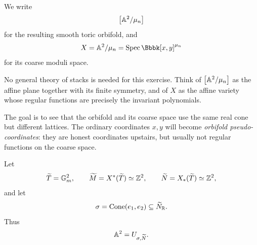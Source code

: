 We write
\[
\left[\mathbb{A}^2/\mu_n\right]
\]
for the resulting smooth toric orbifold, and
\[
X
=
\AAA^2/\mu_n
=
\Spec\Bbbk[x,y]^{\mu_n}
\]
for its coarse moduli space.

No general theory of stacks is needed for this exercise. Think of
\(\left[\mathbb{A}^2/\mu_n\right]\) as the affine plane together with its
finite symmetry, and of \(X\) as the affine variety whose regular
functions are precisely the invariant polynomials.

The goal is to see that the orbifold and its coarse space use the
same real cone but different lattices. The ordinary coordinates
\(x,y\) will become \emph{orbifold pseudo-coordinates}: they are
honest coordinates upstairs, but usually not regular functions on the
coarse space.

Let
\[
\widetilde T=\mathbb{G}_{m}^2,
\qquad
\widetilde M=X^*(\widetilde T)\simeq\mathbb{Z}^2,
\qquad
\widetilde N=X_*(\widetilde T)\simeq\mathbb{Z}^2,
\]
and let
\[
\sigma=\operatorname{Cone}(e_1,e_2)\subseteq\widetilde N_{\mathbb{R}}.
\]
Thus
\[
\mathbb{A}^2=U_{\sigma,\widetilde N}.
\]

